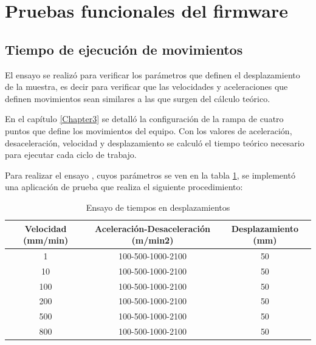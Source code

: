 \section{Pruebas funcionales del firmware}
\subsection{Tiempo de ejecución de movimientos}

El ensayo se realizó para verificar los parámetros que definen el desplazamiento de la muestra, es decir para verificar que las velocidades y aceleraciones que definen movimientos sean similares a las que surgen del cálculo teórico.

En el capítulo \ref{Chapter3} se detalló la configuración de la rampa de cuatro puntos que define los movimientos del equipo. Con los valores de aceleración, desaceleración, velocidad y desplazamiento se calculó el tiempo teórico necesario para ejecutar cada ciclo de trabajo.



Para realizar el ensayo , cuyos parámetros se ven en la tabla \ref{tab:ensayo_comandos}, se implementó una aplicación de prueba que realiza el siguiente procedimiento: 

\begin{table}[h!]
	\centering
	\caption[Ensayo de tiempos en desplazamientos]{Ensayo de tiempos en desplazamientos}
	\begin{tabular}{c c c }    
		\toprule
		\textbf{Velocidad (mm/min)}     & \textbf{Aceleración-Desaceleración (m/min2)} & \textbf{Desplazamiento (mm)} \\
		\midrule
		1  	 & 	   100-500-1000-2100      & 	50  			 	\\		
		10     & 	   100-500-1000-2100  	& 	50 			\\
		100    & 	   100-500-1000-2100 	    & 	50  				\\
		200  	 & 	   100-500-1000-2100 	    & 	50  			\\
		500  	 & 	   100-500-1000-2100      & 	50 					\\
		800  	 & 	   100-500-1000-2100      & 	50 					\\
		\bottomrule
		\hline
	\end{tabular}
	\label{tab:ensayo_comandos}
\end{table}


